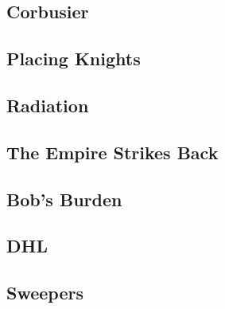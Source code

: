 \documentclass[10pt,a4paper,twoside]{report}
\begin{document}
\newpage
\subsection*{Corbusier}
\begin{keywords}\end{keywords}


\newpage
\subsection*{Placing Knights}
\begin{keywords}\end{keywords}


\newpage
\subsection*{Radiation}
\begin{keywords}\end{keywords}


\newpage
\subsection*{The Empire Strikes Back}
\begin{keywords}\end{keywords}



\newpage
\subsection*{Bob's Burden}
\begin{keywords}\end{keywords}


\newpage
\subsection*{DHL}
\begin{keywords}\end{keywords}


\newpage
\subsection*{Sweepers}
\begin{keywords}\end{keywords}

\end{document}

